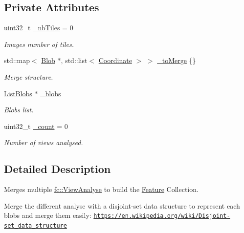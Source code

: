 \subsection*{Private Attributes}
\begin{DoxyCompactItemize}
\item 
uint32\+\_\+t \hyperlink{classfc_1_1BlobMerger_ad1b9d727d311831ea57e8f57161f8e13}{\+\_\+nb\+Tiles} = 0
\begin{DoxyCompactList}\small\item\em Images number of tiles. \end{DoxyCompactList}\item 
std\+::map$<$ \hyperlink{classfc_1_1Blob}{Blob} $\ast$, std\+::list$<$ \hyperlink{namespacefc_a7da125cb1e99553c27c07139ee8a62ca}{Coordinate} $>$ $>$ \hyperlink{classfc_1_1BlobMerger_a290bb3c28c7042b92761ec2a55f017dc}{\+\_\+to\+Merge} \{\}
\begin{DoxyCompactList}\small\item\em Merge structure. \end{DoxyCompactList}\item 
\hyperlink{structfc_1_1ListBlobs}{List\+Blobs} $\ast$ \hyperlink{classfc_1_1BlobMerger_a2754a886c8ef78537af5bd94e564cf55}{\+\_\+blobs}
\begin{DoxyCompactList}\small\item\em Blobs list. \end{DoxyCompactList}\item 
uint32\+\_\+t \hyperlink{classfc_1_1BlobMerger_abea5457da76db98d6a29dd06561d5bcf}{\+\_\+count} = 0
\begin{DoxyCompactList}\small\item\em Number of views analysed. \end{DoxyCompactList}\end{DoxyCompactItemize}


\subsection{Detailed Description}
Merges multiple \hyperlink{classfc_1_1ViewAnalyse}{fc\+::\+View\+Analyse} to build the \hyperlink{classfc_1_1Feature}{Feature} Collection. 

Merge the different analyse with a disjoint-\/set data structure to represent each blobs and merge them easily\+: \href{https://en.wikipedia.org/wiki/Disjoint-set_data_structure}{\tt https\+://en.\+wikipedia.\+org/wiki/\+Disjoint-\/set\+\_\+data\+\_\+structure} 

